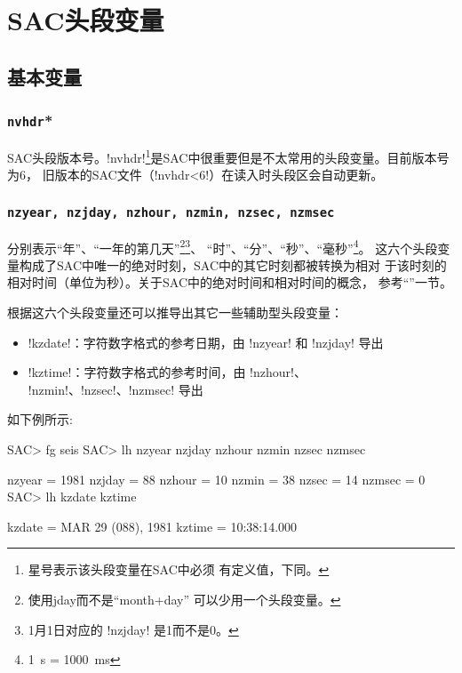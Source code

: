 \section{SAC头段变量}
\label{sec:sac-header-variables}

\subsection{基本变量}

\subsubsection{\texttt{nvhdr}*}
SAC头段版本号。!nvhdr!\footnote{星号表示该头段变量在SAC中必须
有定义值，下同。}是SAC中很重要但是不太常用的头段变量。目前版本号为6，
旧版本的SAC文件（!nvhdr<6!）在读入时头段区会自动更新。

\subsubsection{\texttt{nzyear, nzjday, nzhour, nzmin, nzsec, nzmsec}}
分别表示``年''、``一年的第几天''\footnote{使用jday而不是``month+day''
可以少用一个头段变量。}\footnote{1月1日对应的 !nzjday! 是1而不是0。}、
``时''、``分''、``秒''、``毫秒''\footnote{\SI{1}{\s} = \SI{1000}{\ms}}。
这六个头段变量构成了SAC中唯一的绝对时刻，SAC中的其它时刻都被转换为相对
于该时刻的相对时间（单位为秒）。关于SAC中的绝对时间和相对时间的概念，
参考``''一节。

根据这六个头段变量还可以推导出其它一些辅助型头段变量：
\begin{itemize}
\item !kzdate!：字符数字格式的参考日期，由 !nzyear! 和
    !nzjday! 导出
\item !kztime!：字符数字格式的参考时间，由 !nzhour!、
    !nzmin!、!nzsec!、!nzmsec! 导出
\end{itemize}

如下例所示:
\begin{SACCode}
SAC> fg seis
SAC> lh nzyear nzjday nzhour nzmin nzsec nzmsec

     nzyear = 1981
     nzjday = 88
     nzhour = 10
      nzmin = 38
      nzsec = 14
     nzmsec = 0
SAC> lh kzdate kztime

     kzdate = MAR 29 (088), 1981
     kztime = 10:38:14.000
\end{SACCode}

